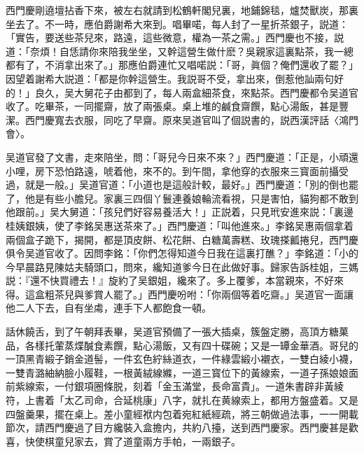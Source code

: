 西門慶剛遶壇拈香下來，被左右就請到松鶴軒閣兒裏，地鋪錦毯，爐焚獸炭，那裏坐去了。不一時，應伯爵謝希大來到。唱畢喏，每人封了一星折茶銀子，説道：「實告，要送些茶兒來，路遠，這些微意，權為一茶之需。」西門慶也不接，説道：「奈煩！自恁請你來陪我坐坐，又幹這營生做什麽？吳親家這裏點茶，我一總都有了，不消拿出來了。」那應伯爵連忙又唱喏説：「哥，眞個？俺們還收了罷？」因望着謝希大説道：「都是你幹這營生。我説哥不受，拿出來，倒惹他訕兩句好的！」良久，吴大舅花子由都到了，每人兩盒細茶食，來點茶。西門慶都令吴道官收了。吃畢茶，一同擺齋，放了兩張桌。桌上堆的鹹食齋饌，點心湯飯，甚是豐潔。西門慶寬去衣服，同吃了早齋。原來吴道官叫了個説書的，説西漢評話〈鴻門會〉。

吴道官發了文書，走來陪坐，問：「哥兒今日來不來？」西門慶道：「正是，小頑還小哩，房下恐怕路遠，唬着他，來不的。到午間，拿他穿的衣服來三寳面前攝受過，就是一般。」吴道官道：「小道也是這般計較，最好。」西門慶道：「別的倒也罷了，他是有些小膽兒。家裏三四個丫鬟連養娘輪流看視，只是害怕，貓狗都不敢到他跟前。」吴大舅道：「孩兒們好容易養活大！」正説着，只見玳安進來説：「裏邊桂姨銀姨，使了李銘吴惠送茶來了。」西門慶道：「叫他進來。」李銘吴惠兩個拿着兩個盒子跪下，揭開，都是頂皮餅、松花餅、白糖萬壽糕、玫瑰搽瓤捲兒，西門慶俱令吴道官收了。因問李銘：「你們怎得知道今日我在這裏打醮？」李銘道：「小的今早晨路見陳姑夫騎頭口，問來，纔知道爹今日在此做好事。歸家告訴桂姐，三媽説：『還不快買禮去！』旋約了吴銀姐，纔來了。多上覆爹，本當親來，不好來得。這盒粗茶兒與爹賞人罷了。」西門慶吩咐：「你兩個等着吃齋。」吴道官一面讓他二人下去，自有坐䖏，連手下人都飽食一頓。

話休饒舌，到了午朝拜表畢，吴道官預備了一張大插桌，簇盤定勝，高頂方糖菓品，各樣托葷蒸煠醎食素饌，點心湯飯，又有四十碟碗；又是一罈金華酒。哥兒的一頂黑青緞子銷金道髻，一件玄色紵絲道衣，一件綠雲緞小襯衣，一雙白綾小襪，一雙青潞紬納臉小履鞋，一根黃絨線縧，一道三寳位下的黃線索，一道子孫娘娘面前紫線索，一付銀項圈條脱，刻着「金玉滿堂，長命富貴」。一道朱書辟非黃綾符，上書着「太乙司命，合延桃康」八字，就扎在黄線索上，都用方盤盛着。又是四盤羹果，擺在桌上。差小童經袱内包着宛紅紙經疏，將三朝做過法事，一一開載節次，請西門慶過了目方纔裝入盒擔内，共約八擡，送到西門慶家。西門慶甚是歡喜，快使棋童兒家去，賞了道童兩方手帕，一兩銀子。

